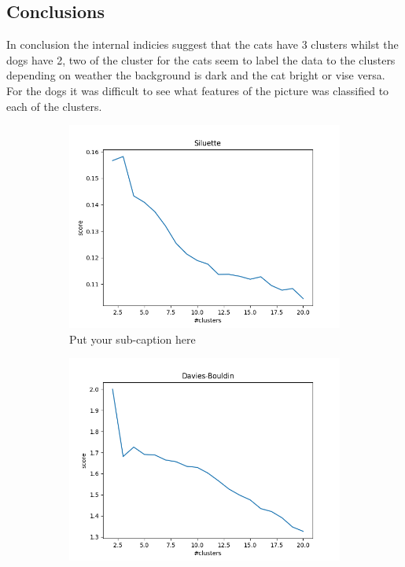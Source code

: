 \documentclass{article}
\begin{document}
\subsection{Conclusions}
In conclusion the internal indicies suggest that the cats have 3 clusters whilst the dogs have 2, two of the cluster for the cats seem to label the data to the clusters depending on weather the background is dark and the cat bright or vise versa. For the dogs it was difficult to see what features of the picture was classified to each of the clusters.
\begin{figure}[ht]
\begin{subfigure}{.33\textwidth}
  \centering
  \includegraphics[width=1\linewidth]{1d/Cats/siluette cats.png}  
  \caption{Put your sub-caption here}
  \label{fig:sub-first}
\end{subfigure}
\begin{subfigure}{.33\textwidth}
  \centering
  \includegraphics[width=1\linewidth]{1d/Cats/davies cats.png}  

\end{subfigure}
\end{figure}
\end{document}
